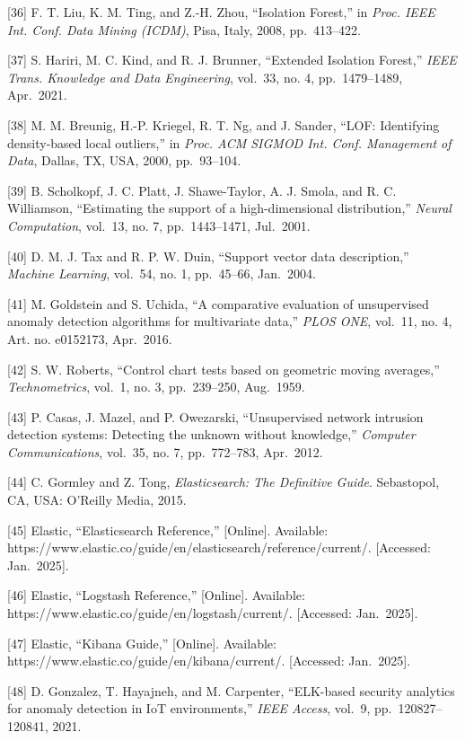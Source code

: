\documentclass[
  a4paper]{report}
\begin{document}
{[}36{]} F. T. Liu, K. M. Ting, and Z.-H. Zhou, ``Isolation Forest,'' in
\emph{Proc. IEEE Int. Conf. Data Mining (ICDM)}, Pisa, Italy, 2008,
pp.~413--422.

{[}37{]} S. Hariri, M. C. Kind, and R. J. Brunner, ``Extended Isolation
Forest,'' \emph{IEEE Trans. Knowledge and Data Engineering}, vol.~33,
no. 4, pp.~1479--1489, Apr.~2021.

{[}38{]} M. M. Breunig, H.-P. Kriegel, R. T. Ng, and J. Sander, ``LOF:
Identifying density-based local outliers,'' in \emph{Proc. ACM SIGMOD
Int. Conf. Management of Data}, Dallas, TX, USA, 2000, pp.~93--104.

{[}39{]} B. Scholkopf, J. C. Platt, J. Shawe-Taylor, A. J. Smola, and R.
C. Williamson, ``Estimating the support of a high-dimensional
distribution,'' \emph{Neural Computation}, vol.~13, no. 7,
pp.~1443--1471, Jul.~2001.

{[}40{]} D. M. J. Tax and R. P. W. Duin, ``Support vector data
description,'' \emph{Machine Learning}, vol.~54, no. 1, pp.~45--66,
Jan.~2004.

{[}41{]} M. Goldstein and S. Uchida, ``A comparative evaluation of
unsupervised anomaly detection algorithms for multivariate data,''
\emph{PLOS ONE}, vol.~11, no. 4, Art. no. e0152173, Apr.~2016.

{[}42{]} S. W. Roberts, ``Control chart tests based on geometric moving
averages,'' \emph{Technometrics}, vol.~1, no. 3, pp.~239--250,
Aug.~1959.

{[}43{]} P. Casas, J. Mazel, and P. Owezarski, ``Unsupervised network
intrusion detection systems: Detecting the unknown without knowledge,''
\emph{Computer Communications}, vol.~35, no. 7, pp.~772--783, Apr.~2012.

{[}44{]} C. Gormley and Z. Tong, \emph{Elasticsearch: The Definitive
Guide}. Sebastopol, CA, USA: O'Reilly Media, 2015.

{[}45{]} Elastic, ``Elasticsearch Reference,'' {[}Online{]}. Available:
https://www.elastic.co/guide/en/elasticsearch/reference/current/.
{[}Accessed: Jan.~2025{]}.

{[}46{]} Elastic, ``Logstash Reference,'' {[}Online{]}. Available:
https://www.elastic.co/guide/en/logstash/current/. {[}Accessed:
Jan.~2025{]}.

{[}47{]} Elastic, ``Kibana Guide,'' {[}Online{]}. Available:
https://www.elastic.co/guide/en/kibana/current/. {[}Accessed:
Jan.~2025{]}.

{[}48{]} D. Gonzalez, T. Hayajneh, and M. Carpenter, ``ELK-based
security analytics for anomaly detection in IoT environments,''
\emph{IEEE Access}, vol.~9, pp.~120827--120841, 2021.
\end{document}
